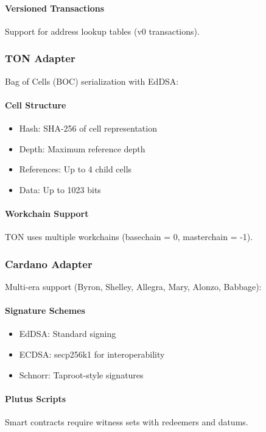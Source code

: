 \documentclass[11pt,twocolumn]{article}
\begin{document}
\paragraph{Versioned Transactions} Support for address lookup tables (v0 transactions).

\subsubsection{TON Adapter}

Bag of Cells (BOC) serialization with EdDSA:

\paragraph{Cell Structure}
\begin{itemize}
\item Hash: SHA-256 of cell representation
\item Depth: Maximum reference depth
\item References: Up to 4 child cells
\item Data: Up to 1023 bits
\end{itemize}

\paragraph{Workchain Support} TON uses multiple workchains (basechain = 0, masterchain = -1).

\subsubsection{Cardano Adapter}

Multi-era support (Byron, Shelley, Allegra, Mary, Alonzo, Babbage):

\paragraph{Signature Schemes}
\begin{itemize}
\item EdDSA: Standard signing
\item ECDSA: secp256k1 for interoperability
\item Schnorr: Taproot-style signatures
\end{itemize}

\paragraph{Plutus Scripts} Smart contracts require witness sets with redeemers and datums.
\end{document}
